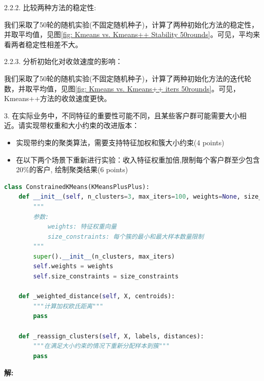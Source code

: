 \documentclass[8pt]{article}
\begin{document}
2.2.2. 比较两种方法的稳定性:

我们采取了50轮的随机实验(不固定随机种子)，计算了两种初始化方法的稳定性，并取平均值，见图\ref{fig: Kmeans vs. Kmeans++ Stability 50rounds}。可见，平均来看两者稳定性相差不大。

2.2.3. 分析初始化对收敛速度的影响：

我们采取了50轮的随机实验(不固定随机种子)，计算了两种初始化方法的迭代轮数，并取平均值，见图\ref{fig: Kmeans vs. Kmeans++ iters 50rounds}。可见，Kmeans++方法的收敛速度更快。

\vspace{3em}

3. 在实际业务中，不同特征的重要性可能不同，且某些客户群可能需要大小相近。请实现带权重和大小约束的改进版本：
\begin{itemize}
    \item 实现带约束的聚类算法，需要支持特征加权和簇大小约束(4 points)
    \item 在以下两个场景下重新进行实验：收入特征权重加倍,限制每个客户群至少包含20\%的客户, 绘制聚类结果(6 points)
\end{itemize}
\begin{lstlisting}[language=Python, caption=带约束的聚类算法部分实现]
class ConstrainedKMeans(KMeansPlusPlus):
    def __init__(self, n_clusters=3, max_iters=100, weights=None, size_constraints=None):
        """
        参数:
            weights: 特征权重向量
            size_constraints: 每个簇的最小和最大样本数量限制
        """
        super().__init__(n_clusters, max_iters)
        self.weights = weights
        self.size_constraints = size_constraints
        
    def _weighted_distance(self, X, centroids):
        """计算加权欧氏距离"""
        pass
        
    def _reassign_clusters(self, X, labels, distances):
        """在满足大小约束的情况下重新分配样本到簇"""
        pass
\end{lstlisting}


\textbf{\large 解:}

\vspace{3em}
\end{document}
